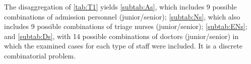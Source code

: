 \documentclass[11pt]{article} %
\begin{document}
\begin{table}[H]
%


\end{table}
 The disaggregation of \ref{tab:T1} yields \ref{subtab:As}, which
includes 9 possible combinations of admission personnel (junior/senior);
\ref{subtab:Ns}, which also includes 9 possible combinations of triage
nurses (junior/senior); \ref{subtab:ENs};
and \ref{subtab:Ds}, with 14 possible combinations of doctors (junior/senior)
in which the examined cases for each type of staff were included.
It is a discrete combinatorial problem.

\begin{table}[H]
\caption{  %
14 Doctor (D) cases. DR\textit{i} represents
Diagnosis Room \emph{i}. Where DJ means Doctor Junior, whereas DS
means Doctor Senior. \label{subtab:Ds} %
}
\centering{}
\end{table}
\end{document}

